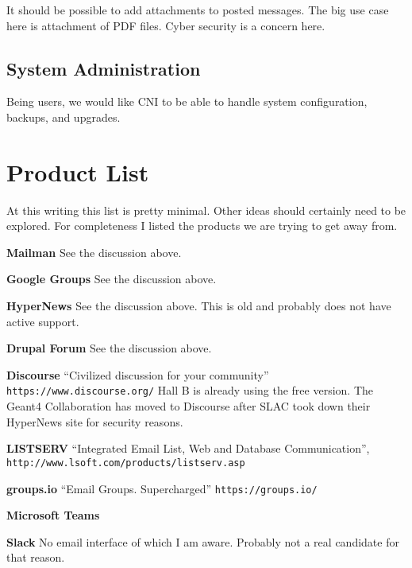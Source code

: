 \documentclass{article}
\begin{document}
It should be possible to add attachments to posted messages. The big
use case here is attachment of PDF files. Cyber security is a concern
here.

\subsection{System Administration}

Being users, we would like CNI to be able to handle system
configuration, backups, and upgrades.

\section{Product List}

At this writing this list is pretty minimal. Other ideas should
certainly need to be explored. For completeness I listed the products
we are trying to get away from.

\begin{description}

\item{\bf Mailman} See the discussion above.

\item{\bf Google Groups} See the discussion above.

\item{\bf HyperNews} See the discussion above. This is old and probably does not have active support.

\item{\bf Drupal Forum} See the discussion above.

\item{\bf Discourse} ``Civilized discussion for your community''
{\tt https://www.discourse.org/} Hall B is already using the free version. The
  Geant4 Collaboration has moved to Discourse after SLAC took down
  their HyperNews site for security reasons.

  \item{\bf LISTSERV} ``Integrated Email List, Web and Database Communication'', {\tt http://www.lsoft.com/products/listserv.asp}

\item{\bf groups.io} ``Email Groups. Supercharged'' {\tt https://groups.io/}

\item{\bf Microsoft Teams}

\item{\bf Slack} No email interface of which I am aware. Probably not a real candidate for that reason.

\end{description}
\end{document}
